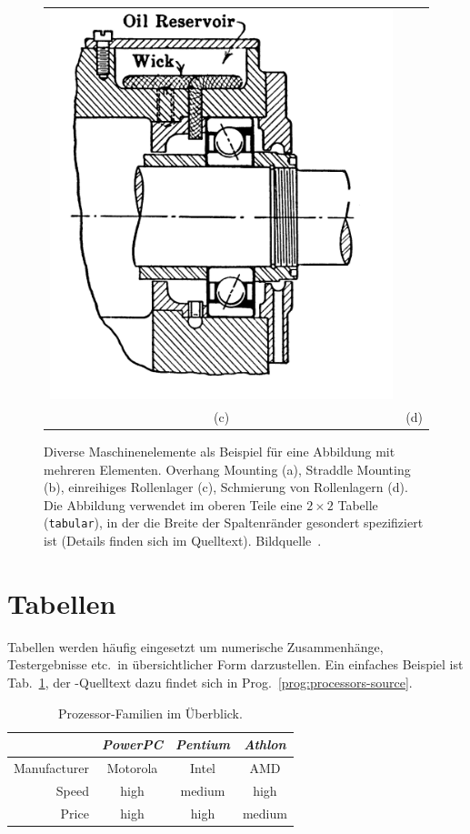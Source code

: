\begin{figure}
\begin{tabular}{c@{\hspace{12mm}}c}
  \includegraphics[width=.45\textwidth]{ball-bearing-2} \\
  (c) & (d)
\end{tabular}
%
\caption{Diverse Maschinenelemente als Beispiel für eine
Abbildung mit mehreren Elementen.
Overhang Mounting (a), Straddle Mounting (b),
einreihiges Rollenlager (c), Schmierung von Rollenlagern (d).
Die Abbildung verwendet im oberen Teile eine $2 \times 2$
Tabelle (\texttt{tabular}), in der die Breite der Spaltenränder 
gesondert spezifiziert ist (Details finden sich im Quelltext).
Bildquelle~\cite{Faires34}.
}
\label{fig:Bearings}
\end{figure}




\section{Tabellen}

Tabellen werden häufig eingesetzt um numerische Zusammenhänge, Testergebnisse
etc.\ in übersichtlicher Form darzustellen.
Ein einfaches Beispiel ist Tab.~\ref{tab:processors}, der \latex-Quelltext dazu
findet sich in Prog.~\ref{prog:processors-source}.


\begin{table}
\caption{Prozessor-Familien im Überblick.}
\label{tab:processors}
\centering
\setlength{\tabcolsep}{5mm}	%
\def\arraystretch{1.25}			%
\begin{tabular}{|r||c|c|c|} \hline
& \emph{PowerPC} & \emph{Pentium} & \emph{Athlon} \\
\hline\hline
Manufacturer & Motorola & Intel & AMD \\
\hline
Speed & high & medium & high   \\
\hline
Price & high & high   & medium \\
\hline
\end{tabular}
\end{table}

